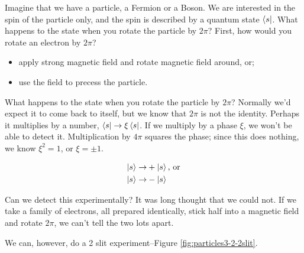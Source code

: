 \documentclass[]{article}
\begin{document}
Imagine that we have a particle, a Fermion or a Boson. We are interested in the spin of the particle only, and the spin is described by a quantum state $\bra{s}$. What happens to the state when you rotate the particle by $2\pi$? First, how would you rotate an electron by $2\pi$?

\begin{itemize}
	\item apply strong magnetic field and rotate magnetic field around, or;
	\item use the field to precess the particle.
\end{itemize}

What happens to the state when you rotate the particle by $2\pi$? Normally we'd expect it to come back to itself, but we know that $2\pi$ is not the identity. Perhaps it multiplies by a number, $\bra{s} \rightarrow \xi \bra{s}$. If we multiply by a phase $\xi$, we won't be able to detect it. Multiplication by $4\pi$ squares the phase; since this does nothing, we know $\xi^2=1$, or $\xi=\pm1$.

\begin{align*}
	\ket{s} \rightarrow& +\ket{s} \text{, or}\\
	\ket{s} \rightarrow& -\ket{s}
\end{align*}

Can we detect this experimentally? It was long thought that we could not. If we take a family of electrons, all prepared identically, stick half into a magnetic field and rotate $2\pi$, we can't tell the two lots apart.

We can, however, do a 2 slit experiment\cite{aharonov1967observability}--Figure \ref{fig:particles3-2-2slit}.
\end{document}
